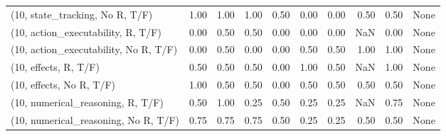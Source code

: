 \begin{table*}[h!]
\begin{adjustbox}{width=2\columnwidth,center}
\begin{tabular}{lrrr|rrr|rrr}
(10, state\_tracking, No R, T/F)       &                      1.00 &                  1.00 &                      1.00 &                          0.50 &                      0.00 &                          0.00 &                                   0.50 &                               0.50 &                                  None \\
(10, action\_executability, R, T/F)    &                      0.00 &                  0.50 &                      0.50 &                          0.00 &                      0.00 &                          0.00 &                                    NaN &                               0.00 &                                  None \\
(10, action\_executability, No R, T/F) &                      0.00 &                  0.50 &                      0.00 &                          0.00 &                      0.50 &                          0.50 &                                   1.00 &                               1.00 &                                  None \\
(10, effects, R, T/F)                 &                      0.50 &                  0.50 &                      0.50 &                          0.00 &                      1.00 &                          0.50 &                                    NaN &                               1.00 &                                  None \\
(10, effects, No R, T/F)              &                      1.00 &                  0.50 &                      0.50 &                          0.00 &                      0.50 &                          0.50 &                                   0.50 &                               0.50 &                                  None \\
(10, numerical\_reasoning, R, T/F)     &                      0.50 &                  1.00 &                      0.25 &                          0.50 &                      0.25 &                          0.25 &                                    NaN &                               0.75 &                                  None \\
(10, numerical\_reasoning, No R, T/F)  &                      0.75 &                  0.75 &                      0.75 &                          0.50 &                      0.25 &                          0.25 &                                   0.50 &                               0.50 &                                  None \\

\end{tabular}
\end{adjustbox}
\end{table*}
